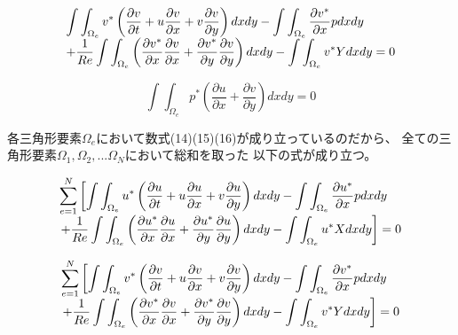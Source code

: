 \documentclass{jarticle}
\begin{document}
\begin{equation}
\begin{tabular}{l}
$\displaystyle
\int\int_{\Omega_e} v^*\left(\frac{\partial v}{\partial t}+u\frac{\partial v}{\partial x}+v\frac{\partial v}{\partial y}\right)dxdy - \int\int_{\Omega_e}\frac{\partial v^*}{\partial x}pdxdy
$
\\
$\displaystyle
+\frac{1}{Re}\int\int_{\Omega_e}\left(\frac{\partial v^*}{\partial x}\frac{\partial v}{\partial x}+\frac{\partial v^*}{\partial y}\frac{\partial v}{\partial y}\right)dxdy-\int\int_{\Omega_e} v^*Ydxdy=0
$
\end{tabular}
\end{equation}


\begin{equation}
\displaystyle
\int\int_{\Omega_e} p^*\left(\frac{\partial u}{\partial x}+\frac{\partial v}{\partial y}\right)dxdy = 0
\end{equation}


各三角形要素$\Omega_e$において数式(14)(15)(16)が成り立っているのだから、
全ての三角形要素$\Omega_1,\Omega_2,...\Omega_N$において総和を取った
以下の式が成り立つ。


\begin{equation}
\begin{tabular}{l}
$\displaystyle
\sum_{e=1}^N\left[\int\int_{\Omega_e} u^*\left(\frac{\partial u}{\partial t}+u\frac{\partial u}{\partial x}+v\frac{\partial u}{\partial y}\right)dxdy - \int\int_{\Omega_e}\frac{\partial u^*}{\partial x}pdxdy\right.
$
\\
$\displaystyle
\left.+\frac{1}{Re}\int\int_{\Omega_e}\left(\frac{\partial u^*}{\partial x}\frac{\partial u}{\partial x}+\frac{\partial u^*}{\partial y}\frac{\partial u}{\partial y}\right)dxdy-\int\int_{\Omega_e} u^*Xdxdy\right]=0
$
\end{tabular}
\end{equation}

\begin{equation}
\begin{tabular}{l}
$\displaystyle
\sum_{e=1}^N\left[\int\int_{\Omega_e} v^*\left(\frac{\partial v}{\partial t}+u\frac{\partial v}{\partial x}+v\frac{\partial v}{\partial y}\right)dxdy - \int\int_{\Omega_e}\frac{\partial v^*}{\partial x}pdxdy\right.
$
\\
$\displaystyle
\left.+\frac{1}{Re}\int\int_{\Omega_e}\left(\frac{\partial v^*}{\partial x}\frac{\partial v}{\partial x}+\frac{\partial v^*}{\partial y}\frac{\partial v}{\partial y}\right)dxdy-\int\int_{\Omega_e} v^*Ydxdy\right]=0
$
\end{tabular}
\end{equation}
\end{document}
